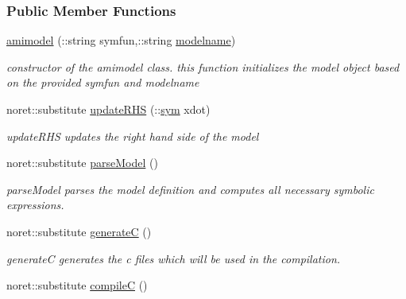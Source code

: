 \subsubsection*{Public Member Functions}
\begin{DoxyCompactItemize}
\item 
\hyperlink{classamimodel_a05d52506788717b3d482845748446a60}{amimodel} (\+::string symfun,\+::string \hyperlink{classamimodel_a71bca9c21a6de42d8079ade31cb61044}{modelname})
\begin{DoxyCompactList}\small\item\em constructor of the amimodel class. this function initializes the model object based on the provided symfun and modelname \end{DoxyCompactList}\item 
noret\+::substitute \hyperlink{classamimodel_abd077fe30143ecfbb165fc2f9a3ded17}{update\+R\+H\+S} (\+::\hyperlink{classamimodel_a3c48fff3d28406486a4f1b5e18da7ca6}{sym} xdot)
\begin{DoxyCompactList}\small\item\em update\+R\+H\+S updates the right hand side of the model \end{DoxyCompactList}\item 
\hypertarget{classamimodel_ae4172c2a8fac8b7c434f03274fcac6ac}{}noret\+::substitute \hyperlink{classamimodel_ae4172c2a8fac8b7c434f03274fcac6ac}{parse\+Model} ()\label{classamimodel_ae4172c2a8fac8b7c434f03274fcac6ac}

\begin{DoxyCompactList}\small\item\em parse\+Model parses the model definition and computes all necessary symbolic expressions. \end{DoxyCompactList}\item 
\hypertarget{classamimodel_a73df9b3d523823e7a0105916471f13f5}{}noret\+::substitute \hyperlink{classamimodel_a73df9b3d523823e7a0105916471f13f5}{generate\+C} ()\label{classamimodel_a73df9b3d523823e7a0105916471f13f5}

\begin{DoxyCompactList}\small\item\em generate\+C generates the c files which will be used in the compilation. \end{DoxyCompactList}\item 
\hypertarget{classamimodel_abf720a0c3104977029538e3b19d429bb}{}noret\+::substitute \hyperlink{classamimodel_abf720a0c3104977029538e3b19d429bb}{compile\+C} ()\label{classamimodel_abf720a0c3104977029538e3b19d429bb}


\end{DoxyCompactItemize}
